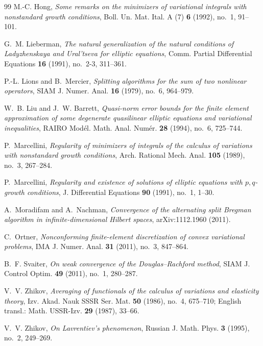 \documentclass[11pt]{amsart}
\theoremstyle{definition}
\theoremstyle{remark}
\numberwithin{equation}{section}
\begin{document}
\begin{thebibliography}{99}
M.-C. Hong, \emph{Some remarks on the minimizers of variational integrals with nonstandard growth conditions}, Boll. Un. Mat. Ital. A (7) \textbf{6} (1992), no.~1, 91--101.

G.~M. Lieberman, \emph{The natural generalization of the natural conditions of Ladyzhenskaya and Ural'tseva for elliptic equations}, Comm. Partial Differential Equations \textbf{16} (1991), no.~2-3, 311--361.

P.-L. Lions and B.~Mercier, \emph{Splitting algorithms for the sum of two nonlinear operators}, SIAM J. Numer. Anal. \textbf{16} (1979), no.~6, 964--979.

W.~B. Liu and J.~W. Barrett, \emph{Quasi-norm error bounds for the finite element approximation of some degenerate quasilinear elliptic equations and variational inequalities}, RAIRO Mod\'el. Math. Anal. Num\'er. \textbf{28} (1994), no.~6, 725--744.

P.~Marcellini, \emph{Regularity of minimizers of integrals of the calculus of variations with nonstandard growth conditions}, Arch. Rational Mech. Anal. \textbf{105} (1989), no.~3, 267--284.

P.~Marcellini, \emph{Regularity and existence of solutions of elliptic equations with $p,q$-growth conditions}, J. Differential Equations \textbf{90} (1991), no.~1, 1--30.

A.~Moradifam and A.~Nachman, \emph{Convergence of the alternating split Bregman algorithm in infinite-dimensional Hilbert spaces}, arXiv:1112.1960 (2011).

C.~Ortner, \emph{Nonconforming finite-element discretization of convex variational problems}, IMA J. Numer. Anal. \textbf{31} (2011), no.~3, 847--864.

B.~F. Svaiter, \emph{On weak convergence of the Douglas--Rachford method}, SIAM J. Control Optim. \textbf{49} (2011), no.~1, 280--287.

V.~V. Zhikov, \emph{Averaging of functionals of the calculus of variations and elasticity theory}, Izv. Akad. Nauk SSSR Ser. Mat. \textbf{50} (1986), no.~4, 675--710; English transl.: Math. USSR-Izv. \textbf{29} (1987), 33--66.

V.~V. Zhikov, \emph{On Lavrentiev's phenomenon}, Russian J. Math. Phys. \textbf{3} (1995), no.~2, 249--269.

\end{thebibliography}
\end{document}
